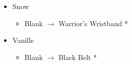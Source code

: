 \documentclass{report}
\begin{document}
\begin{menu}
\begin{itemize}
\begin{itemize}
{\paradigmline{\syn}{\sen}{(\sab)}}%
{\paradigmline{[\syn]}{\rav}{\med}}%
{\paradigmline{\rav}{\rav}{[\med]}}%
{\paradigmline{\rav}{\rav}{[\rav]}}
    \end{itemize}
    \equip
    \begin{itemize}
        \item Snow
        \begin{itemize}
            \item Blank $\rightarrow$ Warrior's Wristband *
        \end{itemize}
        \item Vanille
        \begin{itemize}
            \item Blank $\rightarrow$ Black Belt * 
        \end{itemize}
    \end{itemize}
\end{itemize}
\end{menu}

\renewcommand{\first}{[1] Cerberus (\com/\com/\com)}
\renewcommand{\second}{[2] Cerberus (\com/\com/\com)}
\renewcommand{\third}{[3] Premeditation (\syn/\sen/\sab)}
\renewcommand{\fourth}{[4] Coordination (\syn/\rav/\med)}
\renewcommand{\fifth}{[5] Thaumaturgy (\rav/\rav/\med)}
\renewcommand{\sixth}{[6] Tri-Disaster (\rav/\rav/\rav)}
\end{document}
